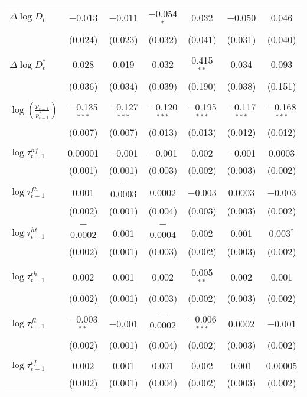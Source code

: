 \begin{tabular}{@{\extracolsep{5pt}}lcccccc}
 $\Delta \log D_t$ & $-$0.013 & $-$0.011 & $-$0.054$^{*}$ & 0.032 & $-$0.050 & 0.046 \\ 
  & (0.024) & (0.023) & (0.032) & (0.041) & (0.031) & (0.040) \\ 
  & & & & & & \\ 
 $\Delta \log D_t^*$ & 0.028 & 0.019 & 0.032 & 0.415$^{**}$ & 0.034 & 0.093 \\ 
  & (0.036) & (0.034) & (0.039) & (0.190) & (0.038) & (0.151) \\ 
  & & & & & & \\ 
 $\log \left(\frac{p_{t-1}}{p_{t-1}^*} \right)$ & $-$0.135$^{***}$ & $-$0.127$^{***}$ & $-$0.120$^{***}$ & $-$0.195$^{***}$ & $-$0.117$^{***}$ & $-$0.168$^{***}$ \\ 
  & (0.007) & (0.007) & (0.013) & (0.013) & (0.012) & (0.012) \\ 
  & & & & & & \\ 
 $\log \tau_{t-1}^{hf}$ & 0.00001 & $-$0.001 & $-$0.001 & 0.002 & $-$0.001 & 0.0003 \\ 
  & (0.001) & (0.001) & (0.003) & (0.002) & (0.003) & (0.002) \\ 
  & & & & & & \\ 
 $\log \tau_{t-1}^{fh}$ & 0.001 & $-$0.0003 & 0.0002 & $-$0.003 & 0.0003 & $-$0.003 \\ 
  & (0.002) & (0.001) & (0.004) & (0.003) & (0.003) & (0.002) \\ 
  & & & & & & \\ 
 $\log \tau_{t-1}^{ht}$ & $-$0.0002 & 0.001 & $-$0.0004 & 0.002 & 0.001 & 0.003$^{*}$ \\ 
  & (0.002) & (0.001) & (0.003) & (0.002) & (0.003) & (0.002) \\ 
  & & & & & & \\ 
 $\log \tau_{t-1}^{th}$ & 0.002 & 0.001 & 0.002 & 0.005$^{**}$ & 0.002 & 0.001 \\ 
  & (0.002) & (0.001) & (0.003) & (0.002) & (0.003) & (0.002) \\ 
  & & & & & & \\ 
 $\log \tau_{t-1}^{ft}$ & $-$0.003$^{**}$ & $-$0.001 & $-$0.0002 & $-$0.006$^{***}$ & 0.0002 & $-$0.001 \\ 
  & (0.002) & (0.001) & (0.004) & (0.002) & (0.003) & (0.002) \\ 
  & & & & & & \\ 
 $\log \tau_{t-1}^{tf}$ & 0.002 & 0.001 & 0.001 & 0.002 & 0.001 & 0.00005 \\ 
  & (0.002) & (0.001) & (0.004) & (0.002) & (0.003) & (0.002) \\ 

\end{tabular}
